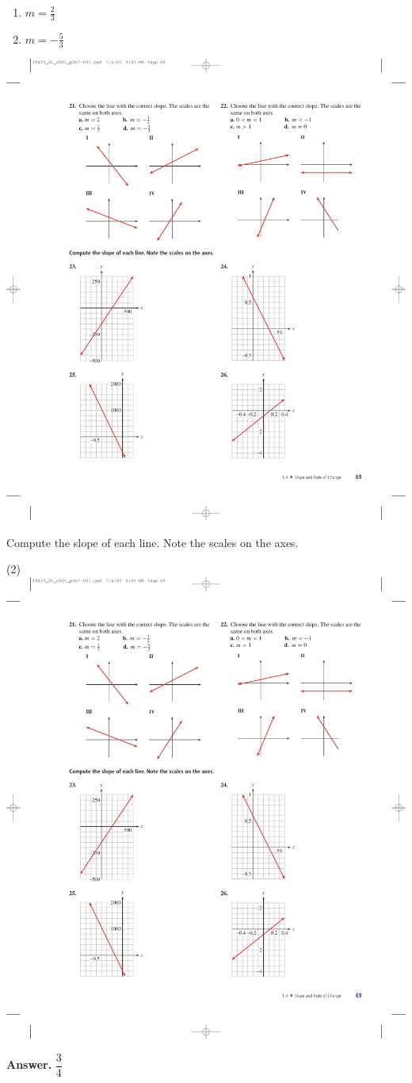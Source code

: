 \documentclass[10pt,]{book}
\theoremstyle{plain}
\theoremstyle{definition}
\theoremstyle{definition}
\theoremstyle{definition}
\theoremstyle{definition}
\numberwithin{equation}{part}
\begin{document}
\begin{exerciselist}
\begin{multicols}{4}
\begin{enumerate}[label=*\alph**]
\item\hypertarget{li-990}{}\(m=\frac{2}{3} \)%
\item\hypertarget{li-991}{}\(m=-\frac{5}{3} \)%
\end{enumerate}
\end{multicols}
 \includegraphics[width=0.6\linewidth]{images/fig-ex-1-4-22}
%
\par\smallskip
\hypertarget{exercisegroup-29}{}\par\noindent Compute the slope of each line. Note the scales on the axes.%
\begin{exercisegroup}(2)
\exercise[23.]\hypertarget{exercise-238}{}\includegraphics[width=0.6\linewidth]{images/fig-ex-1-4-23}
%
\par\smallskip
\noindent\textbf{Answer.}\hypertarget{answer-137}{}\quad
\(\dfrac{3}{4} \)%

\end{exercisegroup}
\end{exerciselist}
\end{document}
